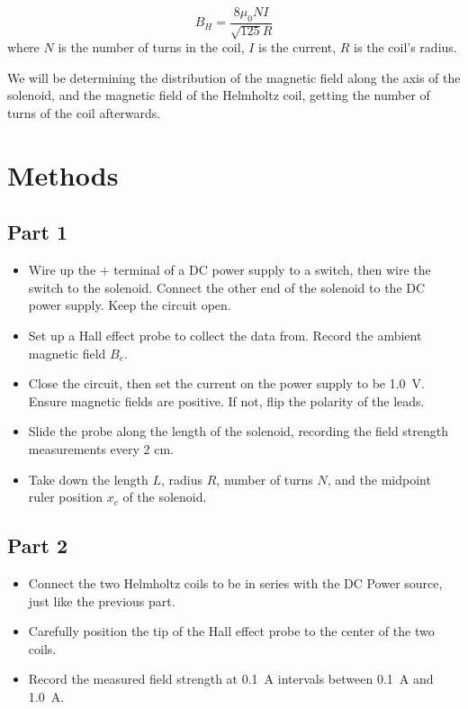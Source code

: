 \documentclass[12pt]{article}
\begin{document}
\begin{equation} \label{eq:B_Helmholtz}
    B_H = \frac{8\mu_0NI}{\sqrt{125}R}
\end{equation}
where $N$ is the number of turns in the coil, $I$ is the current, $R$ is the coil's
radius.

We will be determining the distribution of the magnetic field along the axis of the solenoid,
and the magnetic field of the Helmholtz coil, getting the number of turns of the coil
afterwards.

\section{Methods}
\subsection*{Part 1}
\begin{itemize}
    \item Wire up the $+$ terminal of a DC power supply to a switch, then wire the switch
          to the solenoid. Connect the other end of the solenoid to the DC power supply.
          Keep the circuit open.

    \item Set up a Hall effect probe to collect the data from. Record the ambient magnetic
          field $B_e$.

    \item Close the circuit, then set the current on the power supply to be \SI{1.0}{\volt}.
          Ensure magnetic fields are positive. If not, flip the polarity of the leads.

    \item Slide the probe along the length of the solenoid, recording the field strength
          measurements every 2 cm.

    \item Take down the length $L$, radius $R$, number of turns $N$, and the midpoint ruler
          position $x_c$ of the solenoid.
\end{itemize}

\subsection*{Part 2}
\begin{itemize}
    \item Connect the two Helmholtz coils to be in series with the DC Power source,
          just like the previous part.

    \item Carefully position the tip of the Hall effect probe to the center of the two
          coils.

    \item Record the measured field strength at \SI{0.1}{\ampere} intervals between \SI{0.1}{\ampere}
          and \SI{1.0}{\ampere}.
\end{itemize}
\end{document}
